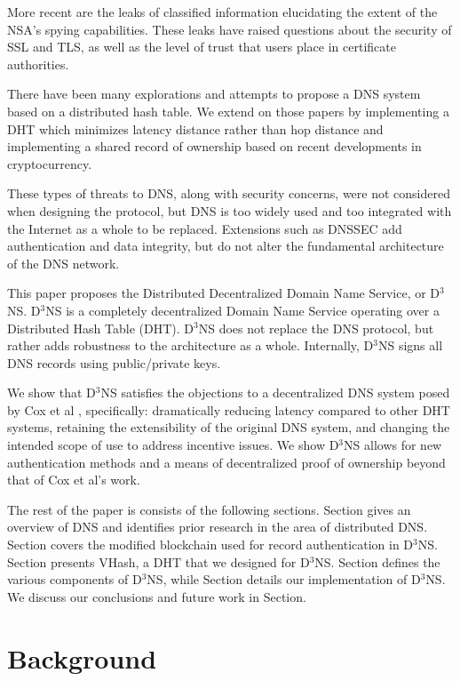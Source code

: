\documentclass[11pt]{IEEEtran} %
\begin{document}
More recent are the leaks of classified information elucidating the extent of the NSA's spying capabilities. These leaks have raised questions about the security of SSL and TLS, as well as the level of trust that users place in certificate authorities.

There have been many explorations and attempts\cite{cox}\cite{pappas}\cite{ramasubramanian2004design} to propose a DNS system based on a distributed hash table\cite{chord}. We extend on those papers by implementing a DHT which minimizes latency distance rather than hop distance and implementing a shared record of ownership based on recent developments in cryptocurrency.\cite{bitcoin}\cite{namecoin}

These types of threats to DNS, along with security concerns, were not considered when designing the protocol, but DNS is too widely used and too integrated with the Internet as a whole to be replaced. Extensions such as DNSSEC \cite{blacka2013clarifications} add authentication and data integrity, but do not alter the fundamental architecture of the DNS network.


This paper proposes the Distributed Decentralized Domain Name Service, or D$^{3}$NS.  D$^{3}$NS is a completely decentralized Domain Name Service operating over a Distributed Hash Table (DHT).  D$^{3}$NS does not replace the DNS protocol, but rather adds robustness to the architecture as a whole.  Internally, D$^3$NS signs all DNS records using public/private keys.


We show that D$^{3}$NS satisfies the objections to a decentralized DNS system posed by Cox et al \cite{cox}, specifically: dramatically reducing latency compared to other DHT systems, retaining the extensibility of the original DNS system, and changing the intended scope of use to address incentive issues. We show D$^{3}$NS allows for new authentication methods and a means of decentralized proof of ownership beyond that of Cox et al's work. 


The rest of the paper is consists of the following sections.  Section gives an overview of DNS and identifies prior research in the area of distributed DNS.  Section covers the modified blockchain used for record authentication in D$^3$NS.  Section presents VHash, a DHT that we designed for D$^3$NS.  Section defines the various components of D$^3$NS, while Section details our implementation of D$^3$NS.  We discuss our conclusions and future work in Section.


\section{Background}
\end{document}
